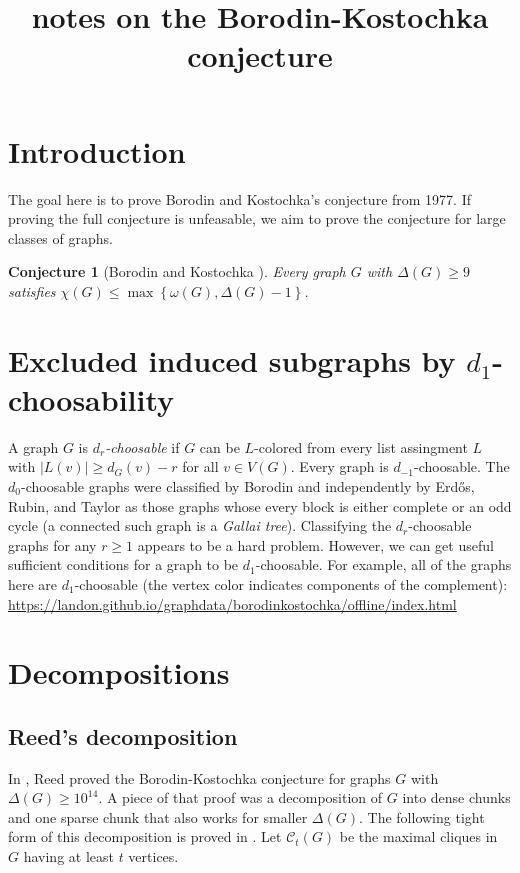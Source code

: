 \documentclass[12pt]{article}
\title{notes on the Borodin-Kostochka conjecture}
\author{}
\theoremstyle{plain}
\newtheorem{conjecture}[thm]{Conjecture}
\theoremstyle{definition}
\theoremstyle{remark}
\newcommand{\fancy}[1]{\mathcal{#1}}
\newcommand{\CC}{\fancy{C}}
\newcommand{\set}[1]{\left\{ #1 \right\}}
\newcommand{\card}[1]{\left|#1\right|}
\begin{document}
\maketitle

\section{Introduction}
The goal here is to prove Borodin and Kostochka's conjecture from 1977.  If proving the full conjecture is unfeasable, we aim to prove the conjecture for large classes of graphs.
\begin{conjecture}[Borodin and Kostochka \cite{borodin1977upper}]
Every graph $G$ with $\Delta(G) \ge 9$ satisfies $\chi(G) \le \max\set{\omega(G), \Delta(G) - 1}$.
\end{conjecture}

\section{Excluded induced subgraphs by $d_1$-choosability}\label{d1choosable}
A graph $G$ is \emph{$d_r$-choosable} if $G$ can be $L$-colored from every list assingment $L$ with $\card{L(v)} \ge d_G(v) - r$ for all $v \in V(G)$.
Every graph is $d_{-1}$-choosable.  
The $d_0$-choosable graphs were classified by Borodin \cite{borodin1977criterion} and independently by Erd\H{o}s, Rubin, and Taylor \cite{erdos1979choosability} as those
graphs whose every block is either complete or an odd cycle (a connected such graph is a \emph{Gallai tree}).  Classifying the $d_r$-choosable graphs for any $r \ge 1$ appears
to be a hard problem.  However, we can get useful sufficient conditions for a graph to be $d_1$-choosable.  For example, all of the graphs here are $d_1$-choosable (the vertex color indicates
components of the complement): \url{https://landon.github.io/graphdata/borodinkostochka/offline/index.html}

\section{Decompositions}
\subsection{Reed's decomposition}
In \cite{reed1999strengthening}, Reed proved the Borodin-Kostochka conjecture for graphs $G$ with $\Delta(G) \ge 10^{14}$.  A piece of that proof was a decomposition of $G$
into dense chunks and one sparse chunk that also works for smaller $\Delta(G)$.  The following tight form of this decomposition is proved in \cite{denseneighborhoods}.
Let $\CC_t(G)$ be the maximal cliques in $G$ having at least $t$ vertices.
\end{document}
